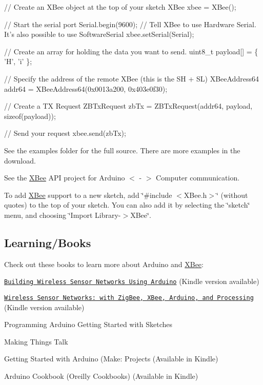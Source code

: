 \begin{DoxyCode}
// Create an XBee object at the top of your sketch
XBee xbee = XBee();

// Start the serial port
Serial.begin(9600);
// Tell XBee to use Hardware Serial. It's also possible to use SoftwareSerial
xbee.setSerial(Serial);

// Create an array for holding the data you want to send.
uint8\_t payload[] = \{ 'H', 'i' \};

// Specify the address of the remote XBee (this is the SH + SL)
XBeeAddress64 addr64 = XBeeAddress64(0x0013a200, 0x403e0f30);

// Create a TX Request
ZBTxRequest zbTx = ZBTxRequest(addr64, payload, sizeof(payload));

// Send your request
xbee.send(zbTx);
\end{DoxyCode}


See the examples folder for the full source. There are more examples in the download.

See the \hyperlink{class_x_bee}{X\+Bee} A\+PI project for Arduino $<$ -\/ $>$ Computer communication.

To add \hyperlink{class_x_bee}{X\+Bee} support to a new sketch, add \char`\"{}\#include $<$\+X\+Bee.\+h$>$\char`\"{} (without quotes) to the top of your sketch. You can also add it by selecting the \char`\"{}sketch\char`\"{} menu, and choosing \char`\"{}\+Import Library-\/$>$\+X\+Bee\char`\"{}.

\subsection*{Learning/\+Books}

Check out these books to learn more about Arduino and \hyperlink{class_x_bee}{X\+Bee}\+:


\begin{DoxyItemize}
\item \href{http://www.amazon.com/gp/product/1784395587/ref=as_li_tl?ie=UTF8&camp=1789&creative=9325&creativeASIN=1784395587&linkCode=as2&tag=xbapra-20&linkId=CEH23GT6ZPOT4ZH4}{\tt Building Wireless Sensor Networks Using Arduino} (Kindle version available)
\item \href{http://www.amazon.com/gp/product/0596807732?ie=UTF8&tag=xbapra-20&linkCode=as2&camp=1789&creative=9325&creativeASIN=0596807732Building}{\tt Wireless Sensor Networks\+: with Zig\+Bee, X\+Bee, Arduino, and Processing} (Kindle version available)
\item Programming Arduino Getting Started with Sketches
\item Making Things Talk
\item Getting Started with Arduino (Make\+: Projects (Available in Kindle)
\item Arduino Cookbook (Oreilly Cookbooks) (Available in Kindle)
\end{DoxyItemize}

